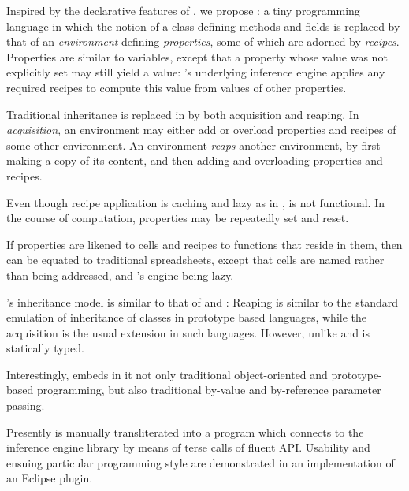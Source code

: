 Inspired by the declarative features of , we propose \Reap: a tiny
programming language in which the notion of a class defining methods and fields
is replaced by that of an \emph{environment} defining \emph{properties}, some
of which are adorned by \emph{recipes}.  Properties are similar to variables,
   except that a property whose value was not explicitly set may still yield a
   value: \Reap's underlying inference engine applies any required recipes to
   compute this value from values of other properties. 

Traditional inheritance is replaced in \Reap by both acquisition and reaping.
In \emph{acquisition}, an environment may either add or overload properties and
recipes of some other environment. An environment \emph{reaps} another
environment, by first making a copy of its content, and then adding and
overloading properties and recipes. 

Even though recipe application is caching and lazy as in
, \Reap is not functional. In the course of
computation, properties may be repeatedly set and reset.

If properties are likened to cells and recipes to functions that reside in them,
then \Reap can be equated to traditional spreadsheets, except that cells
   are named rather than being addressed, and \Reap's engine being lazy. 
   
\Reap's inheritance model is similar to that of  and
: Reaping is similar to the standard emulation of
inheritance of classes in prototype based languages, while the acquisition is the
usual extension in such languages.  However, unlike  and
 \Reap is statically typed.

Interestingly, \Reap embeds in it not only traditional object-oriented and
prototype-based programming, but also traditional by-value and by-reference
parameter passing.  

Presently \Reap is manually transliterated into a  program
which connects to the inference engine library by means of terse calls of
fluent API. Usability and ensuing particular programming style are demonstrated
in an implementation of an Eclipse plugin. 
